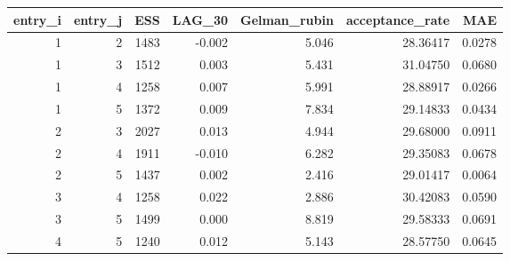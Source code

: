 \begin{longtable}{rrrrrrr}
\toprule
entry\_i & entry\_j & ESS & LAG\_30 & Gelman\_rubin & acceptance\_rate & MAE \\ 
\midrule
1 & 2 & 1483 & -0.002 & 5.046 & 28.36417 & 0.0278 \\ 
1 & 3 & 1512 & 0.003 & 5.431 & 31.04750 & 0.0680 \\ 
1 & 4 & 1258 & 0.007 & 5.991 & 28.88917 & 0.0266 \\ 
1 & 5 & 1372 & 0.009 & 7.834 & 29.14833 & 0.0434 \\ 
2 & 3 & 2027 & 0.013 & 4.944 & 29.68000 & 0.0911 \\ 
2 & 4 & 1911 & -0.010 & 6.282 & 29.35083 & 0.0678 \\ 
2 & 5 & 1437 & 0.002 & 2.416 & 29.01417 & 0.0064 \\ 
3 & 4 & 1258 & 0.022 & 2.886 & 30.42083 & 0.0590 \\ 
3 & 5 & 1499 & 0.000 & 8.819 & 29.58333 & 0.0691 \\ 
4 & 5 & 1240 & 0.012 & 5.143 & 28.57750 & 0.0645 \\ 
\bottomrule
\end{longtable}

